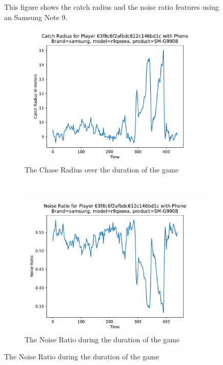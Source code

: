 \documentclass{l4proj}
\begin{document}
\begin{appendices}
\begin{figure}
    \caption{This figure shows the catch radius and the noise ratio features using an Samsung Note 9.
    }
    \label{fig:note9noiseandcatch}
\end{figure}
\begin{figure}
    
    \centering
    \begin{subfigure}[b]{0.48\textwidth}
        \includegraphics[width=\textwidth]{images/samsung-r9qxeea-radius.pdf}
        \caption{The Chase Radius over the duration of the game}
        \label{fig:s21catchradius}
    \end{subfigure}
    ~ %
    \begin{subfigure}[b]{0.48\textwidth}
        \includegraphics[width=\textwidth]{images/samsung-r9qxeea-noiseRatio.pdf}
        \caption{The Noise Ratio during the duration of the game}
        \label{fig:s21noiseratio}
    \end{subfigure}
    

\end{figure}
\end{appendices}
\end{document}
